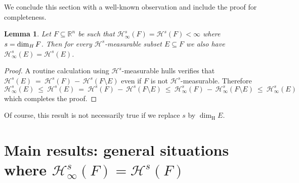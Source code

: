 \documentclass[11pt,english,british]{article}
\numberwithin{equation}{section}
\newtheorem{lma}[thm]{Lemma}
\renewcommand{\leq}{\leqslant}
\renewcommand{\H}{\text{H}}
\begin{document}
\\ \\
We conclude this section with a well-known observation and include the proof for completeness.

\begin{lma} \label{haus11}
Let $F \subseteq \mathbb{R}^n$ be such that $\mathcal{H}^s_\infty(F) = \mathcal{H}^s (F)<\infty $ where $s=\dim_\text{\emph{H}} F$.  Then for every $\mathcal{H}^s$-measurable subset $E \subseteq F$ we also have $\mathcal{H}^s_\infty(E) = \mathcal{H}^s (E)$.
\end{lma}

\begin{proof}
A routine calculation using  $\mathcal{H}^s$-measurable hulls verifies that $\mathcal{H}^s(E)  \ = \  \mathcal{H}^s(F)  \, - \,   \mathcal{H}^s(F \setminus E)$ even if $F$ is not $\mathcal{H}^s$-measurable. Therefore
\[
\mathcal{H}^s_\infty(E) \  \leq  \ \mathcal{H}^s(E)  \ = \  \mathcal{H}^s(F)  \, - \,   \mathcal{H}^s(F \setminus E) \  \leq  \ \mathcal{H}^s_\infty(F) \, - \,   \mathcal{H}^s_\infty(F \setminus E)  \ \leq  \ \mathcal{H}^s_\infty(E)
\]
which completes the proof.
\end{proof}

Of course, this result is not necessarily true if we replace $s$ by $\dim_\H E$.

\section{Main results: general situations where $ \mathcal{H}_\infty^s (F) =  \mathcal{H}^s (F)$ }
\end{document}

